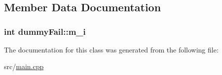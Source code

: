 \subsection{\-Member \-Data \-Documentation}
\hypertarget{classdummy_fail_a95bf590569365b6c11c157b7d8d91fd5}{
\subsubsection[{m\-\_\-i}]{\setlength{\rightskip}{0pt plus 5cm}int {\bf dummy\-Fail\-::m\-\_\-i}}}\label{classdummy_fail_a95bf590569365b6c11c157b7d8d91fd5}


\-The documentation for this class was generated from the following file\-:\begin{DoxyCompactItemize}
\item 
src/\hyperlink{main_8cpp}{main.\-cpp}\end{DoxyCompactItemize}
